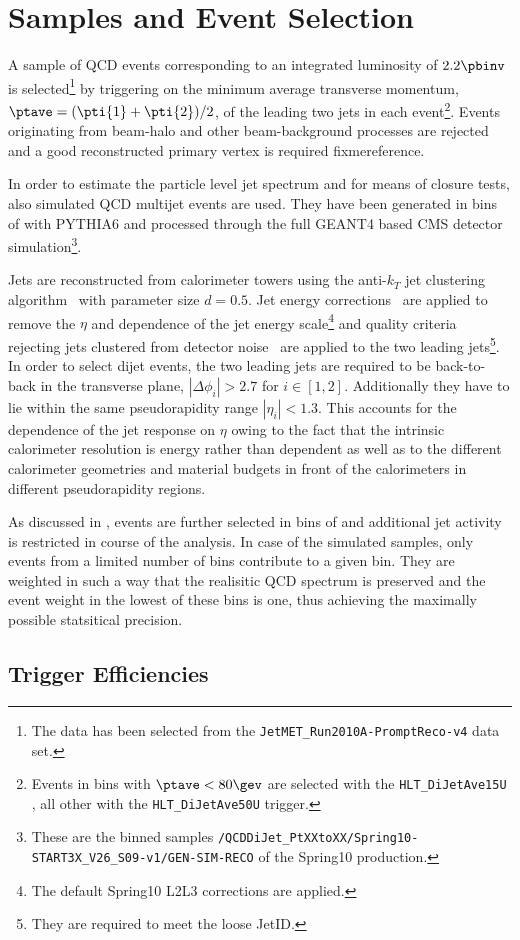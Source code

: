 \section{Samples and Event Selection}\label{sec:ResFit:EvtSel}

A sample of QCD events corresponding to an integrated luminosity of $2.2\pbinv$ is
selected\footnote{The data has been selected from the \texttt{JetMET\_Run2010A-PromptReco-v4} data set.} by triggering on the minimum average transverse momentum, \mbox{$\ptave = (\pti{1} + \pti{2})/2$}, of the leading two jets in each event\footnote{Events in bins with \mbox{$\ptave < 80\gev$} are selected with the \texttt{HLT\_DiJetAve15U} , all other with the \texttt{HLT\_DiJetAve50U} trigger.}.
Events originating from beam-halo and other beam-background processes are rejected~\cite{bib:cmspas:vertex} and a good reconstructed primary vertex is required fixme{reference}.

In order to estimate the particle level jet \pt spectrum and for means of closure tests, also simulated QCD multijet events are used.
They have been generated in bins of \pthat with PYTHIA6  and processed through the full GEANT4  based CMS detector simulation\footnote{These are the \pthat binned samples \texttt{/QCDDiJet\_PtXXtoXX/Spring10-START3X\_V26\_S09-v1/GEN-SIM-RECO} of the Spring10 production.}.

Jets are reconstructed from calorimeter towers using the
anti-$k_{T}$ jet clustering algorithm~\cite{bib:akj} with parameter size \mbox{$d=0.5$}.
Jet energy corrections~\cite{bib:cmspas:jec} are applied to remove the 
$\eta$ and \pt dependence of the jet energy scale\footnote{The default Spring10 L2L3 corrections are applied.} and quality criteria rejecting jets clustered from detector noise~\cite{bib:cmspas:jetid} are applied to the
two leading jets\footnote{They are required to meet the loose JetID.}.
In order to select dijet events, the two leading jets are required to be
back-to-back in the transverse plane, \mbox{$|\Delta\phi_{i}| > 2.7$} for \mbox{$i \in [1,2]$}.
Additionally they have to lie within the same pseudorapidity range \mbox{$|\eta_{i}| < 1.3$}.
This accounts for the dependence of the jet \pt response on $\eta$ owing to the fact that the intrinsic calorimeter resolution is energy rather than \pt dependent as well as to the different calorimeter geometries and material budgets in front of the calorimeters in different pseudorapidity regions.

As discussed in , events are further selected in bins of \ptave and additional
jet activity is restricted in course of the analysis.
In case of the simulated samples, only events from a limited number of \pthat bins contribute to a given \ptave bin.
They are weighted in such a way that the realisitic QCD \pt spectrum is preserved and the event weight in the lowest of these \pthat bins is one, thus achieving the maximally possible statsitical precision.


\subsection{Trigger Efficiencies}